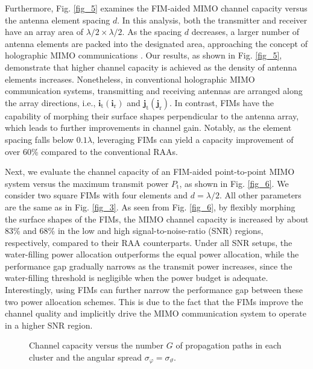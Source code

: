 \documentclass[lettersize,journal]{IEEEtran}
\begin{document}
Furthermore, Fig. \ref{fig_5} examines the FIM-aided MIMO channel capacity versus the antenna element spacing $d$. In this analysis, both the transmitter and receiver have an array area of $\lambda/2 \times \lambda/2$. As the spacing $d$ decreases, a larger number of antenna elements are packed into the designated area, approaching the concept of holographic MIMO communications \cite{CL_2023_An_A1, TWC_2022_Pizzo_Fourier}. Our results, as shown in Fig. \ref{fig_5}, demonstrate that higher channel capacity is achieved as the density of antenna elements increases. Nonetheless, in conventional holographic MIMO communication systems, transmitting and receiving antennas are arranged along the array directions, i.e., $\mathbf{i}_{\textrm{t}}\left ( \mathbf{i}_{\textrm{r}} \right )$ and $\mathbf{j}_{\textrm{t}}\left ( \mathbf{j}_{\textrm{r}} \right )$. In contrast, FIMs have the capability of morphing their surface shapes perpendicular to the antenna array, which leads to further improvements in channel gain. Notably, as the element spacing falls below $0.1\lambda$, leveraging FIMs can yield a capacity improvement of over $60$\% compared to the conventional RAAs.

Next, we evaluate the channel capacity of an FIM-aided point-to-point MIMO system versus the maximum transmit power $P_\textrm{t}$, as shown in Fig. \ref{fig_6}. We consider two square FIMs with four elements and $d = \lambda/2$. All other parameters are the same as in Fig. \ref{fig_3}. As seen from Fig. \ref{fig_6}, by flexibly morphing the surface shapes of the FIMs, the MIMO channel capacity is increased by about $83$\% and $68$\% in the low and high signal-to-noise-ratio (SNR) regions, respectively, compared to their RAA counterparts. Under all SNR setups, the water-filling power allocation outperforms the equal power allocation, while the performance gap gradually narrows as the transmit power increases, since the water-filling threshold is negligible when the power budget is adequate. Interestingly, using FIMs can further narrow the performance gap between these two power allocation schemes. This is due to the fact that the FIMs improve the channel quality and implicitly drive the MIMO communication system to operate in a higher SNR region.





\begin{figure}[!t]
\centering
{}
\caption{Channel capacity versus the number $G$ of propagation paths in each cluster and the angular spread ${\sigma}_{\varphi} = {\sigma}_{\vartheta}$.}
\label{fig_8}
\end{figure}
\end{document}
